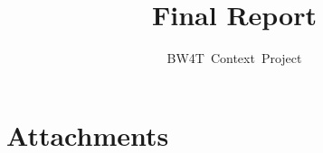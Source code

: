 \documentclass[oneside]{tudelft-report}
\begin{document}
\frontmatter

\title[Blocks World for Teams]{Final Report}
\author{BW4T~Context~Project}
\makecover



\mainmatter
\setcounter{tocdepth}{1}

\tableofcontents









\chapter*{Attachments}




\end{document}
